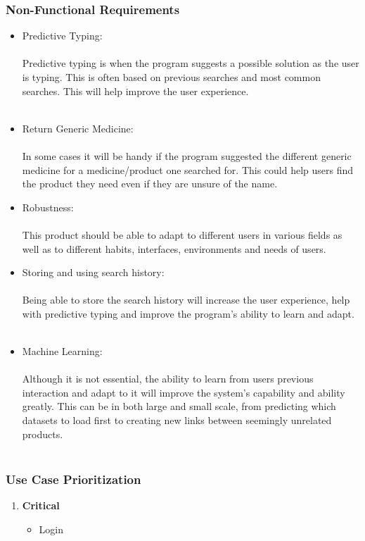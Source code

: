 \documentclass[a4paper,10pt]{article}
\begin{document}
{	\subsubsection{Non-Functional Requirements}
		\begin{itemize}
		\item Predictive Typing:\\\\
			Predictive typing is when the program suggests a possible solution as the user is typing. This is often based on previous searches and most common searches. This will help improve the user experience. \\\\

		\item Return Generic Medicine:\\\\
			In some cases it will be handy if the program suggested the different generic medicine for a medicine/product one searched for. This could help users find the product they need even if they are unsure of the name.
	
		\item Robustness:\\\\
			This product should be able to adapt to different users in various fields as well as to different habits, interfaces, environments and needs of users.  
	
		\item Storing and using search history:\\\\
			Being able to store the search history will increase the user experience, help with predictive typing and improve the program's ability to learn and adapt.\\\\
	
		\item Machine Learning:\\\\
			Although it is not essential, the ability to learn from users previous interaction and adapt to it will improve the system’s capability and ability greatly. This can be in both large and small scale, from predicting which datasets to load first to creating new links between seemingly unrelated products.\\\\
		\end{itemize}

	
	\subsubsection{Use Case Prioritization} 
		\begin{enumerate} 
		\item \textbf{Critical} 
			\begin{itemize} 
				\item Login

\end{itemize}
\end{enumerate}}
\end{document}
